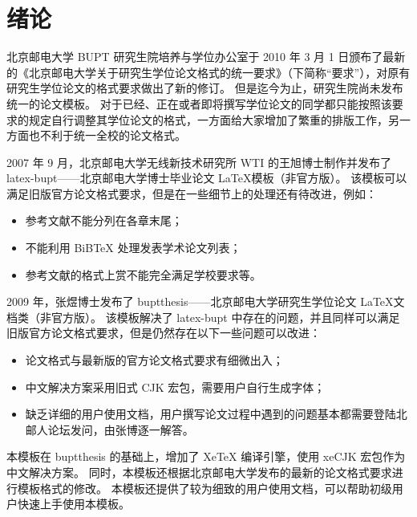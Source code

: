 
\chapter{绪论}
北京邮电大学 \gls*{BUPT} 研究生院培养与学位办公室于 2010 年 3 月 1 日颁布了最新的《北京邮电大学关于研究生学位论文格式的统一要求》（下简称“要求”）\cite{BUPT_Thesis_Format_2010}，对原有研究生学位论文的格式要求做出了新的修订。
但是迄今为止，研究生院尚未发布统一的论文模板。
对于已经、正在或者即将撰写学位论文的同学都只能按照该要求的规定自行调整其学位论文的格式，一方面给大家增加了繁重的排版工作，另一方面也不利于统一全校的论文格式。

2007 年 9 月，北京邮电大学无线新技术研究所 \gls*{WTI} 的王旭博士制作并发布了 latex-bupt——北京邮电大学博士毕业论文 \LaTeX 模板（非官方版）\cite{latex-bupt}。
该模板可以满足旧版官方论文格式要求\cite{BUPT_Thesis_Format_2004}，但是在一些细节上的处理还有待改进，例如：
\begin{itemize}
\item 参考文献不能分列在各章末尾；
\item 不能利用 BiBTeX 处理发表学术论文列表；
\item 参考文献的格式上赏不能完全满足学校要求等。
\end{itemize}

2009 年，张煜博士发布了 buptthesis——北京邮电大学研究生学位论文 \LaTeX 文档类（非官方版）\cite{buptthesis}。
该模板解决了 latex-bupt 中存在的问题，并且同样可以满足旧版官方论文格式要求\cite{BUPT_Thesis_Format_2004}，但是仍然存在以下一些问题可以改进：
\begin{itemize}
\item 论文格式与最新版的官方论文格式要求\cite{BUPT_Thesis_Format_2010}有细微出入；
\item 中文解决方案采用旧式 CJK 宏包，需要用户自行生成字体；
\item 缺乏详细的用户使用文档，用户撰写论文过程中遇到的问题基本都需要登陆北邮人论坛发问，由张博逐一解答。
\end{itemize}

本模板在 buptthesis\cite{buptthesis} 的基础上，增加了 XeTeX 编译引擎，使用 xeCJK 宏包作为中文解决方案。
同时，本模板还根据北京邮电大学发布的最新的论文格式要求进行模板格式的修改。
本模板还提供了较为细致的用户使用文档，可以帮助初级用户快速上手使用本模板。

